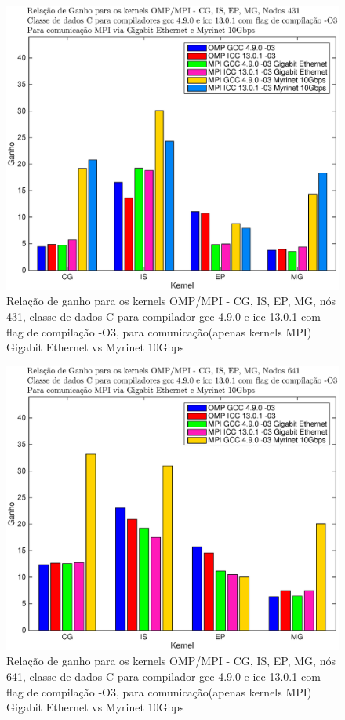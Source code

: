 \documentclass[conference,compsoc]{IEEEtran}
\begin{document}
\begin{figure}[H]
\centering
\includegraphics[width=1.1\columnwidth]{EPS/MPI/431/ganho_mpi_omp_vs_seq_431.eps}
\caption{Relação de ganho para os kernels OMP/MPI - CG, IS, EP, MG, nós 431, classe de dados C para compilador gcc 4.9.0 e icc 13.0.1 com flag de compilação  -O3, para comunicação(apenas kernels MPI) Gigabit Ethernet vs Myrinet 10Gbps}
\label{ganhos_todos_431}
\end{figure}


\begin{figure}[H]
\centering
\includegraphics[width=1.1\columnwidth]{EPS/MPI/641/ganho_mpi_omp_vs_seq_641.eps}
\caption{Relação de ganho para os kernels OMP/MPI - CG, IS, EP, MG, nós 641, classe de dados C para compilador gcc 4.9.0 e icc 13.0.1 com flag de compilação  -O3, para comunicação(apenas kernels MPI) Gigabit Ethernet vs Myrinet 10Gbps}
\label{ganhos_todos_641}
\end{figure}
\end{document}
